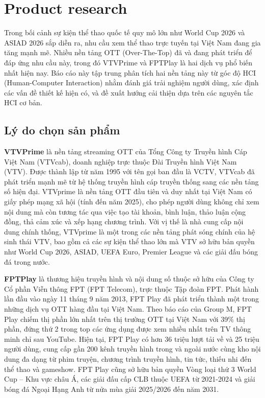 \section{Product research}

Trong bối cảnh sự kiện thể thao quốc tế quy mô lớn như World Cup 2026 và ASIAD 2026 sắp diễn ra, nhu cầu xem thể thao trực tuyến tại Việt Nam đang gia tăng mạnh mẽ. Nhiều nền tảng OTT (Over-The-Top) đã và đang phát triển để đáp ứng nhu cầu này, trong đó VTVPrime và FPTPlay là hai dịch vụ phổ biến nhất hiện nay. Báo cáo này tập trung phân tích hai nền tảng này từ góc độ HCI (Human-Computer Interaction) nhằm đánh giá trải nghiệm người dùng, xác định các vấn đề thiết kế hiện có, và đề xuất hướng cải thiện dựa trên các nguyên tắc HCI cơ bản.

\subsection{Lý do chọn sản phẩm}

\textbf{VTVPrime} là nền tảng streaming OTT của Tổng Công ty Truyền hình Cáp Việt Nam (VTVcab), doanh nghiệp trực thuộc Đài Truyền hình Việt Nam (VTV). Được thành lập từ năm 1995 với tên gọi ban đầu là VCTV, VTVcab đã phát triển mạnh mẽ từ hệ thống truyền hình cáp truyền thống sang các nền tảng số hiện đại. VTVprime là nền tảng OTT đầu tiên và duy nhất tại Việt Nam có giấy phép mạng xã hội (tính đến năm 2025), cho phép người dùng không chỉ xem nội dung mà còn tương tác qua việc tạo tài khoản, bình luận, thảo luận cộng đồng, thả cảm xúc và xếp hạng chương trình. Với vị thế là nhà cung cấp nội dung chính thống, VTVprime là một trong các nền tảng phát sóng chính của hệ sinh thái VTV, bao gồm cả các sự kiện thể thao lớn mà VTV sở hữu bản quyền như World Cup 2026, ASIAD, UEFA Euro, Premier League và các giải đấu bóng đá trong nước.

\textbf{FPTPlay} là thương hiệu truyền hình và nội dung số thuộc sở hữu của Công ty Cổ phần Viễn thông FPT (FPT Telecom), trực thuộc Tập đoàn FPT. Phát hành lần đầu vào ngày 11 tháng 9 năm 2013, FPT Play đã phát triển thành một trong những dịch vụ OTT hàng đầu tại Việt Nam. Theo báo cáo của Group M, FPT Play chiếm thị phần lớn nhất trên thị trường OTT tại Việt Nam với 39\% thị phần, đứng thứ 2 trong top các ứng dụng được xem nhiều nhất trên TV thông minh chỉ sau YouTube. Hiện tại, FPT Play có hơn 36 triệu lượt tải về và 25 triệu người dùng, cung cấp gần 200 kênh truyền hình trong và ngoài nước cùng kho nội dung đa dạng từ phim truyện, chương trình truyền hình, tin tức, thiếu nhi đến thể thao và gameshow. FPT Play cũng sở hữu bản quyền Vòng loại thứ 3 World Cup – Khu vực châu Á, các giải đấu cấp CLB thuộc UEFA từ 2021-2024 và giải bóng đá Ngoại Hạng Anh từ nửa mùa giải 2025/2026 đến năm 2031.

